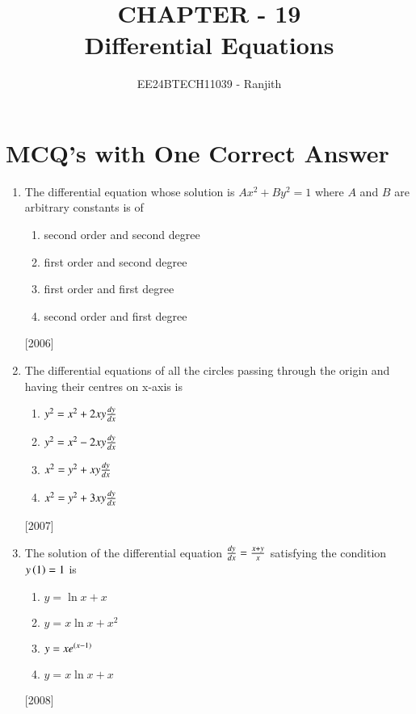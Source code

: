\documentclass[journal]{IEEEtran}
\begin{document}

\onecolumn
\title{CHAPTER - 19\\Differential Equations}
\author{EE24BTECH11039 - Ranjith}
\maketitle



\renewcommand{\thefigure}{\theenumi}
\renewcommand{\thetable}{\theenumi}


\section { MCQ's with One Correct Answer}

\begin{enumerate}
\item The differential equation whose solution is $Ax^2 + By^2 = 1$ where $A$ and $B$ are arbitrary constants is of 



\begin{multicols}{2}
\begin{enumerate}
    \item second order and second degree 
    \item first order and second degree 
    \item first order and first degree 
    \item second order and first degree 

\end{enumerate}
\end{multicols}
\hfill
{[2006]}
\item The differential equations of all the circles passing through the origin and having their centres on x-axis is
\begin{multicols}{2}
\begin{enumerate}
\item $ y^2=x^2 + 2xy\frac{d{y}}{d{x}} $
\item $ y^2=x^2 - 2xy\frac{d{y}}{d{x}}$
\item $ x^2=y^2 + xy\frac{d{y}}{d{x}}$
\item $ x^2 =y^2 + 3xy\frac{d{y}}{d{x}}$
\end{enumerate}
\end{multicols}
\hfill
{{[2007]}}




\item The solution of the differential equation $ \frac{d{y}}{d{x}}=\frac{x+y}{x}$ satisfying the condition $ y\left(1\right)=1 $ is
  \begin{multicols}{2}
    \begin{enumerate}
    \item $ y=  \ln{x}+x $
    \item $y=x\ln{x}+x^2$
    \item $ y=xe^{\left(x-1\right)} $
    \item $ y=x \ln{x}+ x$
       \end{enumerate}
   \end{multicols}
\hfill
{[2008]}



\end{enumerate}
\end{document}
